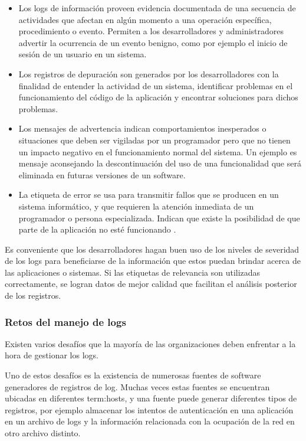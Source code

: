 \begin{itemize}
  \item Los logs de información proveen evidencia documentada de una secuencia
    de actividades que afectan en algún momento a una operación específica,
    procedimiento o evento. Permiten a los desarrolladores y administradores
    advertir la ocurrencia de un evento benigno, como por ejemplo el inicio de
    sesión de un usuario en un sistema.

  \item Los registros de depuración son generados por los desarrolladores con
    la finalidad de entender la actividad de un sistema, identificar problemas
    en el funcionamiento del código de la aplicación y encontrar soluciones
    para dichos problemas.

  \item Los mensajes de advertencia indican comportamientos inesperados o
    situaciones que deben ser vigiladas por un programador pero que no tienen
    un impacto negativo en el funcionamiento normal del sistema. Un ejemplo es
    mensaje aconsejando la descontinuación del uso de una funcionalidad que
    será eliminada en futuras versiones de un software.

  \item La etiqueta de error se usa para transmitir fallos que se producen en
    un sistema informático, y que requieren la atención inmediata de un
    programador o persona especializada. Indican que existe la posibilidad de
    que parte de la aplicación no esté funcionando
    \cite[p.~3]{monitoreo:logging_and_log_management}.
\end{itemize}

Es conveniente que los desarrolladores hagan buen uso de los niveles de
severidad de los logs para beneficiarse de la información que estos puedan
brindar acerca de las aplicaciones o sistemas. Si las etiquetas de relevancia
son utilizadas correctamente, se logran datos de mejor calidad que facilitan el
análisis posterior de los registros.

\subsubsection*{Retos del manejo de logs}
\label{retos_del_manejo_de_logs}

Existen varios desafíos que la mayoría de las organizaciones deben enfrentar a
la hora de gestionar los logs.

Uno de estos desafíos es la existencia de numerosas fuentes de software
generadores de registros de log. Muchas veces estas fuentes se encuentran
ubicadas en diferentes \glspl{term:host}, y una fuente puede generar diferentes
tipos de registros, por ejemplo almacenar los intentos de autenticación en una
aplicación en un archivo de logs y la información relacionada con la ocupación
de la red en otro archivo distinto.

